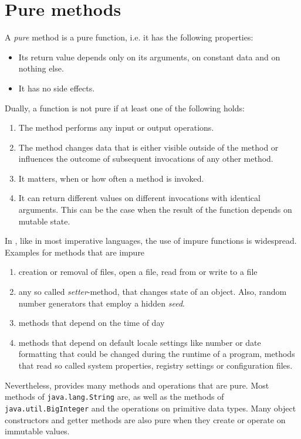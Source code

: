 \section{Pure \java{} methods} \label{pure}

A \emph{pure} \java{} method is a pure function, i.e. it has the following properties:
\begin{itemize}
\item Its return value depends only on its arguments, on constant data and on nothing else.
\item It has no side effects.
\end{itemize}

Dually, a function is not pure if at least one of the following holds:
\begin{enumerate}
\item The method performs any input or output operations.
\item The method changes data that is either visible outside of the method or influences the outcome of subsequent invocations of any other method.
\item It matters, when or how often a method is invoked.
\item It can return different values on different invocations with identical arguments. 
This can be the case when the result of the function depends on mutable state.
\end{enumerate}

In \java{}, like in most imperative languages, the use of impure functions is widespread.
Examples for methods that are impure
\begin{enumerate}
\item creation or removal of files, open a file, read from or write to a file
\item any so called \emph{setter}-method, that changes state of an object. Also, random number generators that employ a hidden \emph {seed}.
\item methods that depend on the time of day
\item methods that depend on default locale settings like number or date formatting that could be changed during the runtime of a program, methods that read so called system properties, registry settings or configuration files.
\end{enumerate}

Nevertheless, \java{} provides many methods and operations that are pure. Most methods of {\tt java.lang.String} are, as well as the methods of \texttt{java.util.BigInteger} and the operations on primitive data types. Many object constructors and getter methods are also pure when they create or 
operate on immutable values.

